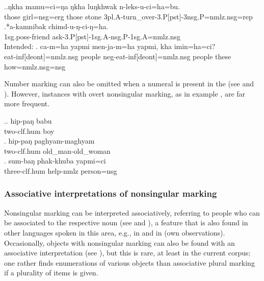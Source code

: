 \ex.\ag.ŋkha mamu=ci=ŋa ŋkha luŋkhwak n-leks-u-ci=ha=bu.\\
 those girl{\sc =nsg=erg} those stone {\sc 3pl.A-}turn\_over{\sc -3.P[pst]-3nsg.P=nmlz.nsg=rep}\\
  
\bg.*a-kamnibak chimd-u-ŋ-ci-ŋ=ha.\\
{\sc 1sg.poss-}friend ask{\sc -3.P[pst]-1sg.A-nsg.P-1sg.A=nmlz.nsg}\\
Intended:  
\bg. ca-m=ha  yapmi  men-ja-m=ha yapmi,  kha imin=ha=ci?\\
	eat-{\sc inf[deont]=nmlz.nsg} people {\sc neg}-eat-{\sc inf[deont]=nmlz.nsg} people these how{\sc =nmlz.nsg=nsg} 		\\
	 
	
	
Number marking can also be omitted when a numeral is present in the  (see \Next[a] and \Next[b]). However, instances with overt nonsingular marking, as in  example \Next[c], are far more frequent.

\ex.\ag.  hip-paŋ     babu\\
two{\sc -clf.hum} boy\\
\bg. hip-paŋ     paghyam-maghyam\\
two{\sc -clf.hum} old\_man-old\_woman\\
 
\bg. sum-baŋ       phak-khuba      yapmi=ci\\
three{\sc -clf.hum} help{\sc -nmlz} person{\sc =nsg}\\
  
  

\subsubsection{Associative interpretations of nonsingular marking}\label{number-2}

Nonsingular marking can be interpreted associatively, referring to people who can be associated to the respective noun (see \Next[a] and \Next[b]), a feature that is also found in other languages spoken in this area, e.g., in  \citep[98]{Genetti2007_Newari} and in  (own observations). Occasionally, objects with nonsingular marking can also be found with an associative interpretation (see \Next[c]), but this is rare, at least in the current corpus; one rather finds enumerations of various objects than associative plural marking if a plurality of items is given.
                                      

